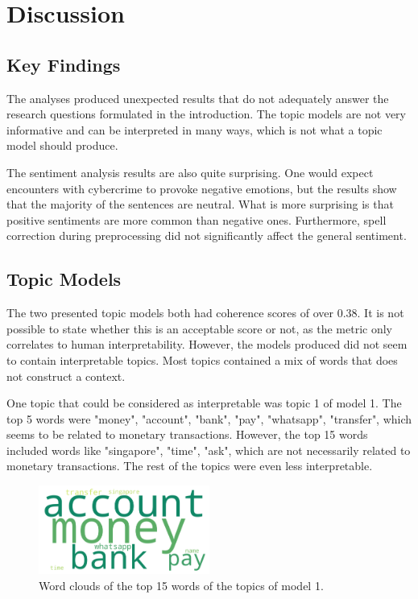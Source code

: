 \section{Discussion}

\subsection*{Key Findings}

The analyses produced unexpected results that do not adequately answer the research questions formulated in the introduction. The topic models are not very informative and can be interpreted in many ways, which is not what a topic model should produce.

The sentiment analysis results are also quite surprising. One would expect encounters with cybercrime to provoke negative emotions, but the results show that the majority of the sentences are neutral. What is more surprising is that positive sentiments are more common than negative ones. Furthermore, spell correction during preprocessing did not significantly affect the general sentiment.

\subsection{Topic Models}

The two presented topic models both had coherence scores of over 0.38. It is not possible to state whether this is an acceptable score or not, as the metric only correlates to human interpretability. However, the models produced did not seem to contain interpretable topics. Most topics contained a mix of words that does not construct a context.

One topic that could be considered as interpretable was topic 1 of model 1. The top 5 words were "money", "account", "bank", "pay", "whatsapp", "transfer", which seems to be related to monetary transactions. However, the top 15 words included words like "singapore", "time", "ask", which are not necessarily related to monetary transactions. The rest of the topics were even less interpretable.

\begin{figure}[H]
    \centering
    \includegraphics[width=0.5\textwidth]{resources/word_cloud1.png}
    \caption{Word clouds of the top 15 words of the topics of model 1.}
    \label{fig:wordclouds}
\end{figure}

